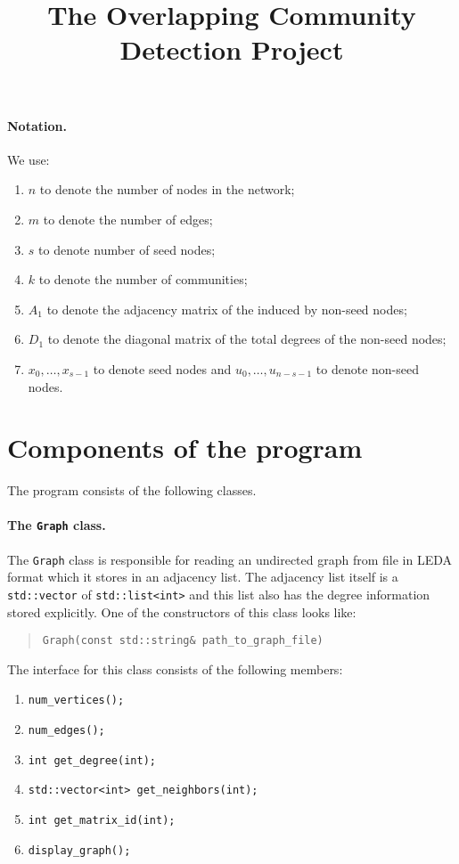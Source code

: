 \documentclass[12pt]{article}
\title{The Overlapping Community Detection Project}
\begin{document}
\maketitle

\paragraph{Notation.} We use: 
\begin{enumerate}
	\item $n$ to denote the number of nodes in the network;
	\item $m$ to denote the number of edges;
	\item $s$ to denote number of seed nodes;	
	\item $k$ to denote the number of communities;
	\item $A_1$ to denote the adjacency matrix of the induced by non-seed nodes;
	\item $D_1$ to denote the diagonal matrix of the total degrees of the non-seed nodes;
	\item $x_0, \ldots, x_{s-1}$ to denote seed nodes and $u_0, \ldots, u_{n - s -1}$ 
			to denote non-seed nodes. 
\end{enumerate}

\section{Components of the program}

The program consists of the following classes.
\paragraph{The \texttt{Graph} class.} The \verb|Graph| class 
is responsible for reading an undirected graph from file 
in LEDA format which it stores in an adjacency list. 
The adjacency list itself is a \verb|std::vector| 
of \verb|std::list<int>| and this list also has the degree 
information stored explicitly. One of the constructors of this class looks like:
\begin{quote}
\verb|Graph(const std::string& path_to_graph_file)| 
\end{quote}

The interface for this class consists of the following members: 
\begin{enumerate}
	\item \verb|num_vertices();|
	\item \verb|num_edges();| 
	\item \verb|int get_degree(int);|
	\item \verb|std::vector<int> get_neighbors(int);|
	\item \verb|int get_matrix_id(int);| 
	\item \verb|display_graph();|
	\end{enumerate}
\end{document}
